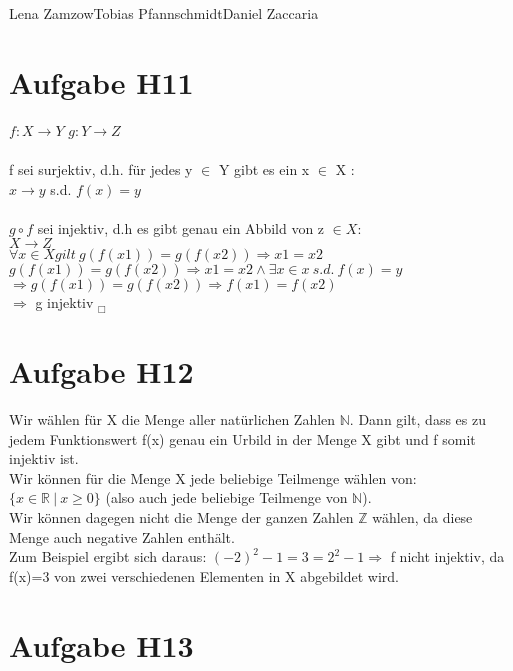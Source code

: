 \documentclass[11pt,a4paper]{article}
\begin{document}
                {Lena Zamzow}{Tobias Pfannschmidt}{Daniel Zaccaria}{}{}



\section*{Aufgabe H11}
$f:X \longrightarrow Y$ $ g:Y \longrightarrow Z$\\
\\
f sei surjektiv, d.h. für jedes y $\in $ Y gibt es ein x $\in$ X : \\
$x \longrightarrow y$ s.d. $f(x)=y$\\
\\
$g\circ f$ sei injektiv, d.h es gibt genau ein Abbild von z $ \in X: $\\
$ X \longrightarrow Z~ $\\
$\forall x \in X gilt~g(f(x1))=g(f(x2)) \Rightarrow x1 = x2$\\ 

$g(f(x1))=g(f(x2)) \Rightarrow x1=x2 \wedge \exists x \in x ~ s.d. ~f(x)=y$\\ 
$ \Rightarrow g(f(x1)) = g(f(x2))\Rightarrow f(x1)=f(x2)$\\
$\Rightarrow$ g injektiv   $_\Box$

\section*{Aufgabe H12}

Wir wählen für X die Menge aller natürlichen Zahlen $\mathbb{N}$. Dann gilt, dass es zu jedem Funktionswert f(x) genau ein Urbild in der Menge X gibt und f somit injektiv ist.
\\ Wir können für die Menge X jede beliebige Teilmenge wählen von: $\{x \in \mathbb{R} ~| ~ x \geq 0\}$ (also auch jede beliebige Teilmenge von $\mathbb{N}$).
\\Wir können dagegen nicht die Menge der ganzen Zahlen $\mathbb{Z}$ wählen, da diese Menge auch negative Zahlen enthält.
\\ Zum Beispiel ergibt sich daraus: $(-2)^2 - 1 = 3 = 2^2 -1 \Rightarrow$ f nicht injektiv, da f(x)=3 von zwei verschiedenen Elementen in X abgebildet wird.

\section*{Aufgabe H13}
\end{document}
